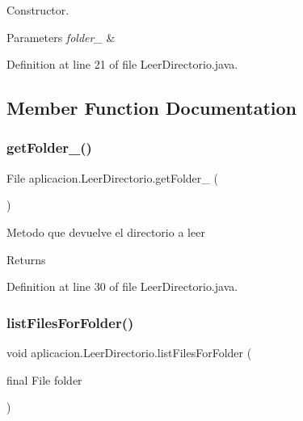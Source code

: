 Constructor. 
\begin{DoxyParams}{Parameters}
{\em folder\+\_\+} & \\
\hline
\end{DoxyParams}


Definition at line 21 of file Leer\+Directorio.\+java.



\subsection{Member Function Documentation}
\hypertarget{classaplicacion_1_1_leer_directorio_aa9db3677912609ea74f9b21c654c6ad8}{}\label{classaplicacion_1_1_leer_directorio_aa9db3677912609ea74f9b21c654c6ad8} 
\subsubsection{\texorpdfstring{get\+Folder\+\_\+()}{getFolder\_()}}
{\footnotesize\ttfamily File aplicacion.\+Leer\+Directorio.\+get\+Folder\+\_\+ (\begin{DoxyParamCaption}{ }\end{DoxyParamCaption})}

Metodo que devuelve el directorio a leer \begin{DoxyReturn}{Returns}

\end{DoxyReturn}


Definition at line 30 of file Leer\+Directorio.\+java.

\hypertarget{classaplicacion_1_1_leer_directorio_a59321b6374b5ef72ac862f6b283399c9}{}\label{classaplicacion_1_1_leer_directorio_a59321b6374b5ef72ac862f6b283399c9} 
\subsubsection{\texorpdfstring{list\+Files\+For\+Folder()}{listFilesForFolder()}}
{\footnotesize\ttfamily void aplicacion.\+Leer\+Directorio.\+list\+Files\+For\+Folder (\begin{DoxyParamCaption}\item[{final File}]{folder }\end{DoxyParamCaption})}

